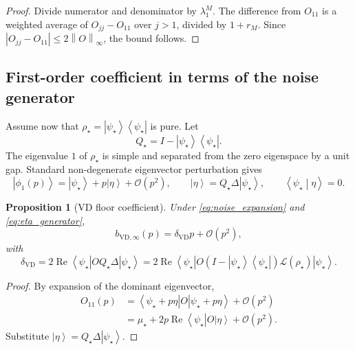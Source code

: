 \documentclass[11pt]{article}
\newtheorem{proposition}{Proposition}
\newcommand{\1}{\mathbf{1}}
\newcommand{\OO}{\mathcal{O}}
\newcommand{\norm}[1]{\left\lVert #1 \right\rVert}
\newcommand{\abs}[1]{\left\lvert #1 \right\rvert}
\newcommand{\ip}[2]{\left\langle #1\middle|#2\right\rangle}
\newcommand{\bra}[1]{\left\langle #1\right|}
\newcommand{\ket}[1]{\left|#1\right\rangle}
\begin{document}
\begin{proof}
Divide numerator and denominator by \(\lambda_1^M\).  The difference from \(O_{11}\) is a weighted average of \(O_{jj}-O_{11}\) over \(j>1\), divided by \(1+r_M\).  Since \(\abs{O_{jj}-O_{11}}\leq2\norm O_\infty\), the bound follows.
\end{proof}

\subsection{First-order coefficient in terms of the noise generator}

Assume now that \(\rho_\star=\ket{\psi_\star}\bra{\psi_\star}\) is pure.  Let
\begin{equation}
    Q_\star=I-\ket{\psi_\star}\bra{\psi_\star}.
\end{equation}
The eigenvalue \(1\) of \(\rho_\star\) is simple and separated from the zero eigenspace by a unit gap.  Standard non-degenerate eigenvector perturbation gives
\begin{equation}
    \ket{\phi_1(p)}=\ket{\psi_\star}+p\ket{\eta}+\OO(p^2),
    \qquad
    \ket{\eta}=Q_\star\Delta\ket{\psi_\star},
    \qquad
    \ip{\psi_\star}{\eta}=0.
    \label{eq:eta_generator}
\end{equation}

\begin{proposition}[VD floor coefficient]
\label{prop:vd_delta_generator}
Under \cref{eq:noise_expansion} and \cref{eq:eta_generator},
\begin{equation}
    b_{\mathrm{VD},\infty}(p)=\delta_{\mathrm{VD}}p+\OO(p^2),
\end{equation}
with
\begin{equation}
    \delta_{\mathrm{VD}}
    =2\operatorname{Re}\bra{\psi_\star}OQ_\star\Delta\ket{\psi_\star}
    =2\operatorname{Re}\bra{\psi_\star}O(I-\ket{\psi_\star}\bra{\psi_\star})\mathcal L(\rho_\star)\ket{\psi_\star}.
    \label{eq:delta_vd_explicit}
\end{equation}
\end{proposition}

\begin{proof}
By expansion of the dominant eigenvector,
\begin{align}
    O_{11}(p)
    &=\bra{\psi_\star+p\eta}O\ket{\psi_\star+p\eta}+\OO(p^2)\\
    &=\mu_\star+2p\operatorname{Re}\bra{\psi_\star}O\ket{\eta}+\OO(p^2).
\end{align}
Substitute \(\ket\eta=Q_\star\Delta\ket{\psi_\star}\).
\end{proof}
\end{document}
